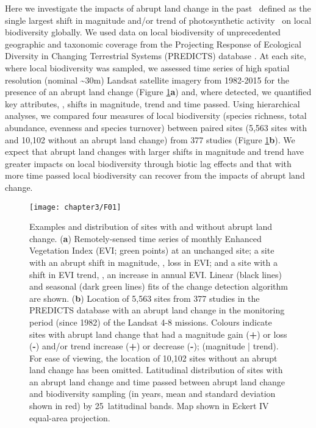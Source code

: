 Here we investigate the impacts of abrupt land change in the past \textendash\ defined as the single largest shift in magnitude and/or trend of photosynthetic activity \citep{Verbesselt2010a,dejong2013,Song2018} \textendash\ on local biodiversity globally. We used data on local biodiversity of unprecedented geographic and taxonomic coverage from the Projecting Response of Ecological Diversity in Changing Terrestrial Systems (PREDICTS) database \citep{Hudson2016}. At each site, where local biodiversity was sampled, we assessed time series of high spatial resolution (nominal \textasciitilde30m) Landsat satellite imagery from 1982-2015 for the presence of an abrupt land change (Figure \ref{F03_01}\textbf{a}) and, where detected, we quantified key attributes, \ie, shifts in magnitude, trend and time passed. Using hierarchical analyses, we compared four measures of local biodiversity (species richness, total abundance, evenness and species turnover) between paired sites (5,563 sites with and 10,102 without an abrupt land change) from 377 studies (Figure \ref{F03_01}\textbf{b}). We expect that abrupt land changes with larger shifts in magnitude and trend have greater impacts on local biodiversity through biotic lag effects and that with more time passed local biodiversity can recover from the impacts of abrupt land change.

\begin{figure}[!htb]
\centering
\texttt{[image: chapter3/F01]}
\caption{Examples and distribution of sites with and without abrupt land change. (\textbf{a}) Remotely-sensed time series of monthly Enhanced Vegetation Index (EVI; green points) at an unchanged site; a site with an abrupt shift in magnitude, \ie, loss in EVI; and a site with a shift in EVI trend, \ie, an increase in annual EVI. Linear (black lines) and seasonal (dark green lines) fits of the change detection algorithm \citep{Verbesselt2010a} are shown. (\textbf{b}) Location of 5,563 sites from 377 studies in the PREDICTS database with an abrupt land change in the monitoring period (since 1982) of the Landsat 4-8 missions. Colours indicate sites with abrupt land change that had a magnitude gain (\textbf{+}) or loss (\textbf{-}) and/or trend increase (\textbf{+}) or decrease (\textbf{-}); (magnitude | trend). For ease of viewing, the location of 10,102 sites without an abrupt land change has been omitted. Latitudinal distribution of sites with an abrupt land change and time passed between abrupt land change and biodiversity sampling (in years, mean and standard deviation shown in red) by 25\textdegree\ latitudinal bands. Map shown in Eckert IV equal-area projection.}
\label{F03_01}
\end{figure}
\clearpage %

